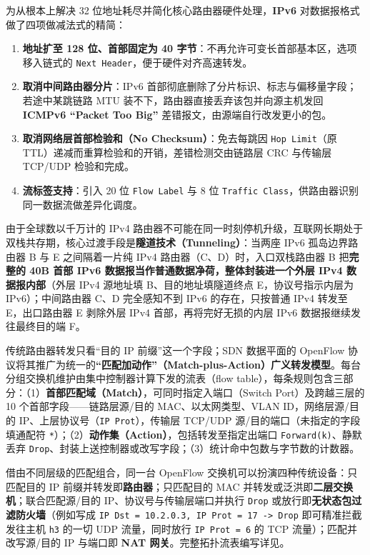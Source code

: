 
为从根本上解决 32 位地址耗尽并简化核心路由器硬件处理，\textbf{IPv6} 对数据报格式做了四项做减法式的精简：
\begin{enumerate}
\item \textbf{地址扩至 128 位、首部固定为 40 字节}：不再允许可变长首部基本区，选项移入链式的 \texttt{Next Header}，便于硬件对齐高速转发。
\item \textbf{取消中间路由器分片}：IPv6 首部彻底删除了分片标识、标志与偏移量字段；若途中某跳链路 MTU 装不下，路由器直接丢弃该包并向源主机发回 \textbf{ICMPv6 ``Packet Too Big''} 差错报文，由源端自行改发更小的包。
\item \textbf{取消网络层首部检验和（No Checksum）}：免去每跳因 \texttt{Hop Limit}（原 TTL）递减而重算检验和的开销，差错检测交由链路层 CRC 与传输层 TCP/UDP 检验和完成。
\item \textbf{流标签支持}：引入 20 位 \texttt{Flow Label} 与 8 位 \texttt{Traffic Class}，供路由器识别同一数据流做差异化调度。
\end{enumerate}

由于全球数以千万计的 IPv4 路由器不可能在同一时刻停机升级，互联网长期处于双栈共存期，核心过渡手段是\textbf{隧道技术（Tunneling）}：当两座 IPv6 孤岛边界路由器 B 与 E 之间隔着一片纯 IPv4 路由器（C、D）时，入口双栈路由器 B 把\textbf{完整的 40B 首部 IPv6 数据报当作普通数据净荷，整体封装进一个外层 IPv4 数据报内部}（外层 IPv4 源地址填 B、目的地址填隧道终点 E，协议号指示内层为 IPv6）；中间路由器 C、D 完全感知不到 IPv6 的存在，只按普通 IPv4 转发至 E，出口路由器 E 剥除外层 IPv4 首部，再将完好无损的内层 IPv6 数据报继续发往最终目的端 F。



传统路由器转发只看“目的 IP 前缀”这一个字段；SDN 数据平面的 OpenFlow 协议将其推广为统一的\textbf{“匹配加动作”（Match-plus-Action）广义转发模型}。每台分组交换机维护由集中控制器计算下发的流表（flow table），每条规则包含三部分：（1）\textbf{首部匹配域（Match）}，可同时指定入端口（Switch Port）及跨越三层的 10 个首部字段——链路层源/目的 MAC、以太网类型、VLAN ID，网络层源/目的 IP、上层协议号（\texttt{IP Prot}），传输层 TCP/UDP 源/目的端口（未指定的字段填通配符 \texttt{*}）；（2）\textbf{动作集（Action）}，包括转发至指定出端口 \texttt{Forward(k)}、静默丢弃 \texttt{Drop}、封装上送控制器或改写字段；（3）统计命中包数与字节数的计数器。

借由不同层级的匹配组合，同一台 OpenFlow 交换机可以扮演四种传统设备：只匹配目的 IP 前缀并转发即\textbf{路由器}；只匹配目的 MAC 并转发或泛洪即\textbf{二层交换机}；联合匹配源/目的 IP、协议号与传输层端口并执行 \texttt{Drop} 或放行即\textbf{无状态包过滤防火墙}（例如写成 \texttt{IP Dst = 10.2.0.3, IP Prot = 17 -> Drop} 即可精准拦截发往主机 \texttt{h3} 的一切 UDP 流量，同时放行 \texttt{IP Prot = 6} 的 TCP 流量）；匹配并改写源/目的 IP 与端口即 \textbf{NAT 网关}。完整拓扑流表编写详见。

